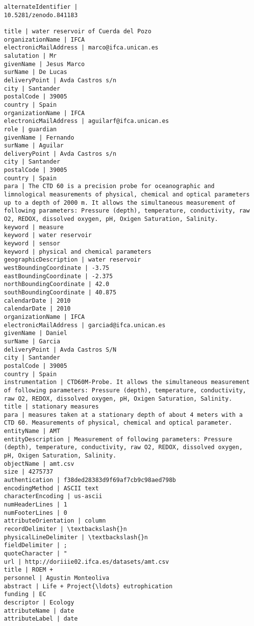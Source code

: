 \documentclass[11pt]{article}
\begin{document}
    \begin{Verbatim}[commandchars=\\\{\}]
alternateIdentifier | 
10.5281/zenodo.841183

title | water reservoir of Cuerda del Pozo
organizationName | IFCA
electronicMailAddress | marco@ifca.unican.es
salutation | Mr
givenName | Jesus Marco
surName | De Lucas
deliveryPoint | Avda Castros s/n
city | Santander
postalCode | 39005
country | Spain
organizationName | IFCA
electronicMailAddress | aguilarf@ifca.unican.es
role | guardian
givenName | Fernando
surName | Aguilar
deliveryPoint | Avda Castros s/n
city | Santander
postalCode | 39005
country | Spain
para | The CTD 60 is a precision probe for oceanographic and limnological measurements of physical, chemical and optical parameters up to a depth of 2000 m. It allows the simultaneous measurement of following parameters: Pressure (depth), temperature, conductivity, raw O2, REDOX, dissolved oxygen, pH, Oxigen Saturation, Salinity.
keyword | measure
keyword | water reservoir
keyword | sensor
keyword | physical and chemical parameters
geographicDescription | water reservoir
westBoundingCoordinate | -3.75
eastBoundingCoordinate | -2.375
northBoundingCoordinate | 42.0
southBoundingCoordinate | 40.875
calendarDate | 2010
calendarDate | 2010
organizationName | IFCA
electronicMailAddress | garciad@ifca.unican.es
givenName | Daniel
surName | Garcia
deliveryPoint | Avda Castros S/N
city | Santander
postalCode | 39005
country | Spain
instrumentation | CTD60M-Probe. It allows the simultaneous measurement of following parameters: Pressure (depth), temperature, conductivity, raw O2, REDOX, dissolved oxygen, pH, Oxigen Saturation, Salinity.
title | stationary measures
para | measures taken at a stationary depth of about 4 meters with a CTD 60. Measurements of physical, chemical and optical parameter.
entityName | AMT
entityDescription | Measurement of following parameters: Pressure (depth), temperature, conductivity, raw O2, REDOX, dissolved oxygen, pH, Oxigen Saturation, Salinity.
objectName | amt.csv
size | 4275737
authentication | f38ded28383d9f69af7cb9c98aed798b
encodingMethod | ASCII text
characterEncoding | us-ascii
numHeaderLines | 1
numFooterLines | 0
attributeOrientation | column
recordDelimiter | \textbackslash{}n
physicalLineDelimiter | \textbackslash{}n
fieldDelimiter | ;
quoteCharacter | "
url | http://doriiie02.ifca.es/datasets/amt.csv
title | ROEM +
personnel | Agustin Monteoliva
abstract | Life + Project{\ldots} eutrophication
funding | EC
descriptor | Ecology
attributeName | date
attributeLabel | date

\end{Verbatim}
\end{document}
